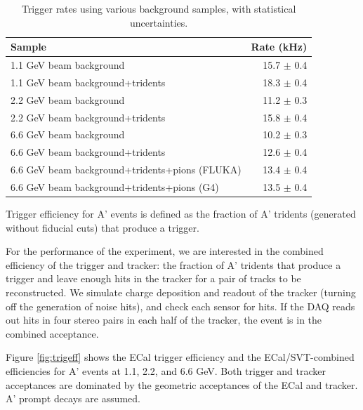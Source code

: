 \begin{table}
	\begin{tabular}{|l|r|}
		\hline
		Sample &  Rate (kHz)\\
		\hline
		1.1 GeV	beam background 				& 15.7 $\pm$ 0.4	\\
		1.1 GeV beam background+tridents			& 18.3 $\pm$ 0.4	\\
		2.2 GeV	beam background 				& 11.2 $\pm$ 0.3	\\
		2.2 GeV beam background+tridents			& 15.8 $\pm$ 0.4	\\
		6.6 GeV	beam background 				& 10.2 $\pm$ 0.3	\\
		6.6 GeV beam background+tridents			& 12.6 $\pm$ 0.4	\\
		6.6 GeV beam background+tridents+pions (FLUKA)	& 13.4 $\pm$ 0.4	\\
		6.6 GeV beam background+tridents+pions (G4)	& 13.5 $\pm$ 0.4	\\
		\hline
	\end{tabular}
	\caption{ {\small Trigger rates using various background samples, with statistical uncertainties. }
	\label{tab:trigrates}}
\end{table}

Trigger efficiency for A' events is defined as the fraction of A' tridents (generated without fiducial cuts) that produce a trigger.

For the performance of the experiment, we are interested in the combined efficiency of the trigger and tracker: the fraction of A' tridents that produce a trigger and leave enough hits in the tracker for a pair of tracks to be reconstructed.
We simulate charge deposition and readout of the tracker (turning off the generation of noise hits), and check each sensor for hits. 
If the DAQ reads out hits in four stereo pairs in each half of the tracker, the event is in the combined acceptance.

Figure \ref{fig:trigeff} shows the ECal trigger efficiency and the ECal/SVT-combined efficiencies for A' events at 1.1, 2.2, and 6.6 GeV. 
Both trigger and tracker acceptances are dominated by the geometric acceptances of the ECal and tracker.
A' prompt decays are assumed.

